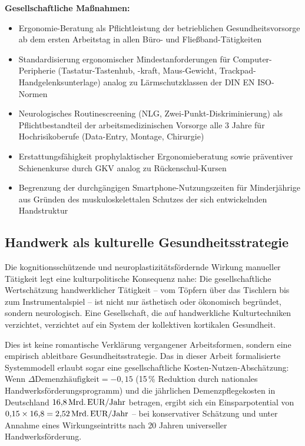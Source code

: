 ﻿\documentclass[12pt,a4paper]{report}
\theoremstyle{plain}
\theoremstyle{definition}
\theoremstyle{remark}
\begin{document}
\textbf{Gesellschaftliche Maßnahmen:}
\begin{itemize}
\item Ergonomie-Beratung als Pflichtleistung der betrieblichen
  Gesundheitsvorsorge ab dem ersten Arbeitstag in allen Büro- und
  Fließband-Tätigkeiten
\item Standardisierung ergonomischer Mindestanforderungen für
  Computer-Peripherie (Tastatur-Tastenhub, -kraft, Maus-Gewicht,
  Trackpad-Handgelenksunterlage) analog zu Lärmschutzklassen
  der DIN EN ISO-Normen
\item Neurologisches Routinescreening (NLG, Zwei-Punkt-Diskriminierung)
  als Pflichtbestandteil der arbeitsmedizinischen Vorsorge alle 3 Jahre
  für Hochrisikoberufe (Data-Entry, Montage, Chirurgie)
\item Erstattungsfähigkeit prophylaktischer Ergonomieberatung sowie
  präventiver Schienenkurse durch GKV analog zu Rückenschul-Kursen
\item Begrenzung der durchgängigen Smartphone-Nutzungszeiten für
  Minderjährige aus Gründen des muskuloskelettalen Schutzes der
  sich entwickelnden Handstruktur
\end{itemize}

\subsection{Handwerk als kulturelle Gesundheitsstrategie}

Die kognitionsschützende und neuroplastizitätsfördernde Wirkung
manueller Tätigkeit legt eine kulturpolitische Konsequenz nahe:
Die gesellschaftliche Wertschätzung handwerklicher Tätigkeit --
vom Töpfern über das Tischlern bis zum Instrumentalspiel -- ist nicht
nur ästhetisch oder ökonomisch begründet, sondern neurologisch.
Eine Gesellschaft, die auf handwerkliche Kulturtechniken verzichtet,
verzichtet auf ein System der kollektiven kortikalen Gesundheit.

Dies ist keine romantische Verklärung vergangener Arbeitsformen, sondern
eine empirisch ableitbare Gesundheitsstrategie. Das in dieser Arbeit
formalisierte Systemmodell erlaubt sogar eine gesellschaftliche
Kosten-Nutzen-Abschätzung: Wenn $\Delta\text{Demenzhäufigkeit} = -0{,}15$
(15\,\% Reduktion durch nationales Handwerksförderungsprogramm) und
die jährlichen Demenzpflegekosten in Deutschland $16{,}8\,\text{Mrd.\,EUR}/
\text{Jahr}$ betragen, ergibt sich ein Einsparpotential von
$0{,}15 \times 16{,}8 = 2{,}52\,\text{Mrd.\,EUR}/\text{Jahr}$ --
bei konservativer Schätzung und unter Annahme eines Wirkungseintritts
nach 20 Jahren universeller Handwerksförderung.
\end{document}
